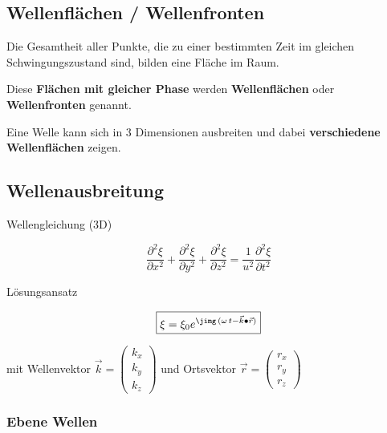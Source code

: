 \subsection{Wellenflächen / Wellenfronten}
Die Gesamtheit aller Punkte, die zu einer bestimmten Zeit im gleichen Schwingungszustand sind, bilden eine Fläche im Raum.

\smallskip

Diese \textbf{Flächen mit gleicher Phase} werden \textbf{Wellenflächen} oder \textbf{Wellenfronten} genannt.

\smallskip

Eine Welle kann sich in 3 Dimensionen ausbreiten und dabei \textbf{verschiedene Wellenflächen} zeigen. 


\subsection{Wellenausbreitung}

\begin{minipage}{0.25\columnwidth}
    Wellengleichung (3D)
\end{minipage}
\hfill
\begin{minipage}{0.73\columnwidth}
    $$\boxed{ \frac{\partial^2 \xi}{\partial x^2} + \frac{\partial^2 \xi}{\partial y^2} + \frac{\partial^2 \xi}{\partial z^2} = \frac{1}{u^2} \frac{\partial^2 \xi}{\partial t^2}  }$$
\end{minipage}

\begin{minipage}{0.25\columnwidth}
    Lösungsansatz
\end{minipage}
\hfill
\begin{minipage}{0.73\columnwidth}
    $$ \boxed{ \xi = \xi_0 e^{\jimg \, (\omega \, t - \vec{k} \bullet \vec{r})} }$$
\end{minipage}

\medskip

mit Wellenvektor $\vec{k} = \begin{pmatrix} k_x \\ k_y \\ k_z  \end{pmatrix}$ und Ortsvektor $ \vec{r} = \begin{pmatrix} r_x \\ r_y \\ r_z  \end{pmatrix}$


\subsubsection{Ebene Wellen}

